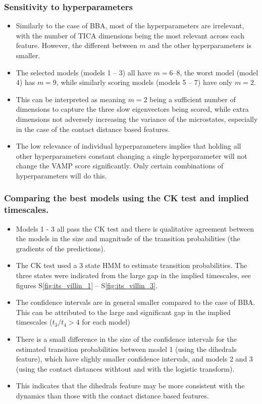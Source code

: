 \documentclass[journal=jacsat,manuscript=article]{achemso}
\newcommand*\sref[1]{%
    S\ref{#1}}
\begin{document}
\subsubsection{Sensitivity to hyperparameters}
\begin{itemize}
    \item Similarly to the case of BBA, most of the hyperparameters are irrelevant, with the number of TICA dimensions being the most relevant across each feature.  However, the different between $m$ and the other hyperparameters is smaller. 
    \item The selected models (models 1 -- 3) all have $m = \numrange[range-phrase= --]{6}{8}$, the worst model (model 4) has $m=9$, while similarly scoring models (models 5 -- 7) have only $m=2$.  
    \item This can be interpreted as meaning $m=2$ being a sufficient number of dimensions to capture the three slow eigenvectors being scored, while extra dimensions not adversely increasing the variance of the microstates, especially in the case of the contact distance based features.  
    \item The low relevance of individual hyperparameters implies that holding all other hyperparameters constant changing a single hyperparameter will not change the VAMP score significantly. Only certain combinations of hyperparameters will do this.   
\end{itemize}

\subsubsection{Comparing the best models using the CK test and implied timescales. }
\begin{itemize}
    \item Models 1 - 3 all pass the CK test and there is qualitative agreement between the models in the size and magnitude of the transition probabilities (the gradients of the predictions). 
    \item The CK test used a 3 state HMM to estimate transition probabilities. The three states were indicated from the large gap in the implied timescales, see figures \sref{fig:its_villin_1}  -- \sref{fig:its_villin_3}. 
    \item The confidence intervals are in general smaller compared to the case of BBA. This can be attributed to the large and significant gap in the implied timescales ($t_3/t_4 > 4$ for each model)
    \item There is a small difference in the size of the confidence intervals for the estimated transition probabilities between model 1 (using the dihedrals feature), which have slighly smaller confidence intervals, and models 2 and 3 (using the contact distances withtout and with the logistic transform). 
    \item This indicates that the dihedrals feature may be more consistent with the dynamics than those with the contact distance based features. 
\end{itemize}
\end{document}
